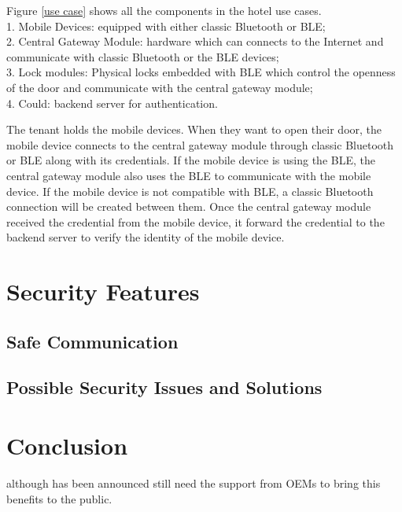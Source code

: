 \documentclass{cseminar}
\begin{document}
Figure \ref{use case} shows all the components in the hotel use cases.
\\1. Mobile Devices: equipped with either classic Bluetooth or BLE;
\\2. Central Gateway Module: hardware which can connects to the Internet and communicate with classic Bluetooth or the BLE devices;
\\3. Lock modules: Physical locks embedded with BLE which control the openness of the door and communicate with the central gateway module;
\\4. Could: backend server for authentication.

The tenant holds the mobile devices. When they want to open their door, the mobile device connects to the central gateway module through classic Bluetooth or BLE along with its credentials. If the mobile device is using the BLE, the central gateway module also uses the BLE to communicate with the mobile device. If the mobile device is not compatible with BLE, a classic Bluetooth connection will be created between them. Once the central gateway module received the credential from the mobile device, it forward the credential to the backend server to verify the identity of the mobile device.
\section{Security Features}

\subsection{Safe Communication}

\subsection{Possible Security Issues and Solutions}
\section{Conclusion}
although has been announced still need the support from OEMs to bring this benefits to the public.




\end{document}
